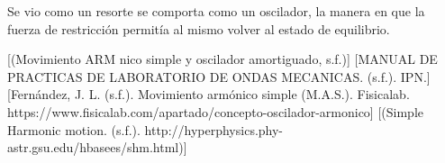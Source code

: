 \documentclass[10pt]{article}
\begin{document}
\begin{multicols}{2}
Se vio como un resorte se comporta como un oscilador, la manera en que la fuerza de restricción permitía al mismo volver al estado de equilibrio.


\begin{thebibliography}{0}
	[(Movimiento ARM nico simple y oscilador amortiguado, s.f.)]
	[MANUAL DE PRACTICAS DE LABORATORIO DE ONDAS MECANICAS. (s.f.). IPN.]
	[Fernández, J. L. (s.f.). Movimiento armónico simple (M.A.S.). Fisicalab. https://www.fisicalab.com/apartado/concepto-oscilador-armonico]
	[(Simple Harmonic motion. (s.f.). http://hyperphysics.phy-astr.gsu.edu/hbasees/shm.html)]
\end{thebibliography}

\end{multicols}
\end{document}
